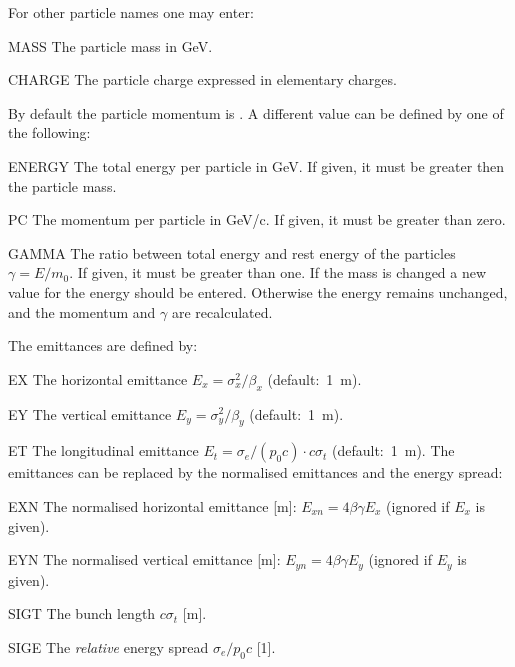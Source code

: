 For other particle names one may enter:
\begin{description}
\item{MASS}
  The particle mass in GeV.
\item{CHARGE}
  The particle charge expressed in elementary charges.
\end{description}
By default the particle momentum is .
A different value can be defined by one of the following:
\begin{description}
\item{ENERGY}
  The total energy per particle in GeV.
  If given, it must be greater then the particle mass.
\item{PC}
  The momentum per particle in GeV/c.
  If given, it must be greater than zero.
\item{GAMMA}
  The ratio between total energy and rest energy of the particles
  $\gamma = E / m_0$.
  If given, it must be greater than one.
  If the mass is changed a new value for the energy should be entered.
  Otherwise the energy remains unchanged,
  and the momentum and $\gamma$ are recalculated.
\end{description}
The emittances are defined by:
\begin{description}
\item{EX}
  The horizontal emittance
  $E_x=\sigma_x^2/\beta_x$
  (default:~1~m).
\item{EY}
  The vertical emittance
  $E_y=\sigma_y^2/\beta_y$
  (default:~1~m).
\item{ET}
  The longitudinal emittance
  $E_t=\sigma_e/(p_0c) \cdot c\sigma_t$
  (default:~1~m).
  The emittances can be replaced
  by the normalised emittances and the energy spread:
\item{EXN}
  The normalised horizontal emittance [m]:
  $E_{xn}=4\beta\gamma E_x$
  (ignored if $E_x$ is given).
\item{EYN}
  The normalised vertical emittance [m]:
  $E_{yn}=4\beta \gamma E_y$
  (ignored if $E_y$ is given).
\item{SIGT}
  The bunch length $c\sigma_t$ [m].
\item{SIGE}
  The {\em relative} energy spread $\sigma_e/p_0 c$ [1].
\end{description}
